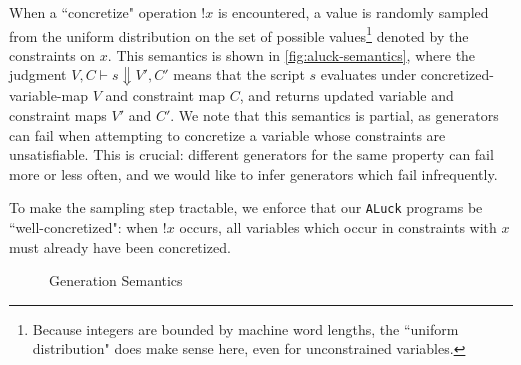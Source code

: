 \documentclass[sigconf,nonacm]{acmart}
\begin{document}
When a ``concretize" operation $!x$ is encountered, a value is randomly sampled from
the uniform distribution on the set of possible values\footnote{ Because
integers are bounded by machine word lengths, the ``uniform distribution" does
make sense here, even for unconstrained variables.  } denoted by the constraints
on $x$. This semantics is shown in \autoref{fig:aluck-semantics}, where the
judgment $V,C \vdash s \Downarrow V',C'$ means that the script $s$ evaluates
under concretized-variable-map $V$ and constraint map $C$, and returns updated
variable and constraint maps $V'$ and $C'$. We note that this semantics is partial,
as generators can fail when attempting to concretize a variable whose constraints are unsatisfiable.
This is crucial: different generators for the same property can fail more or
less often, and we would like to infer generators which fail infrequently.

To make the sampling step tractable, we enforce that our \texttt{ALuck} programs be
``well-concretized": when $!x$ occurs, all variables which occur
in constraints with $x$ must already have been concretized.



\begin{figure}
\vspace{-10px}
\caption{Generation Semantics}
\label{fig:aluck-semantics}

\vspace{-15px}
\end{figure}
\end{document}
